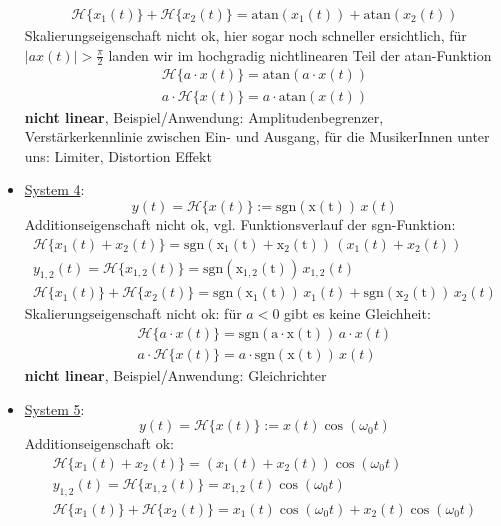 \documentclass[11pt,a4paper,DIV=12]{scrartcl}
\numberwithin{equation}{section}
\numberwithin{figure}{section}
\newcommand{\sysH}[1]{\mathcal{H}{\{#1\}}}
\begin{document}
\begin{Loesung}
\begin{itemize}
\begin{align}
\sysH{x_1(t)} + \sysH{x_2(t)} = \mathrm{atan}(x_1(t)) + \mathrm{atan}(x_2(t))
\end{align}
Skalierungseigenschaft nicht ok, hier sogar noch schneller ersichtlich, für
$|a x(t)|>\frac{\pi}{2}$ landen wir im hochgradig nichtlinearen Teil der atan-Funktion
\begin{align}
\sysH{a \cdot x(t)}= \mathrm{atan}(a \cdot x(t))\\
a \cdot \sysH{x(t)}= a \cdot \mathrm{atan}(x(t))
\end{align}
\textbf{nicht linear}, Beispiel/Anwendung: Amplitudenbegrenzer, Verstärkerkennlinie
zwischen Ein- und Ausgang, für die MusikerInnen unter uns: Limiter, Distortion Effekt
\item  \underline{System 4}:
\begin{equation}
y(t) = \sysH{x(t)}:= \mathrm{sgn(x(t))} \, x(t)
\end{equation}
Additionseigenschaft nicht ok, vgl. Funktionsverlauf der sgn-Funktion:
\begin{align}
\sysH{x_1(t)+x_2(t)}=\mathrm{sgn(x_1(t)+x_2(t))} \, (x_1(t)+x_2(t))\\
y_{1,2}(t) = \sysH{x_{1,2}(t)}= \mathrm{sgn(x_{1,2}(t))} \, x_{1,2}(t)\\
\sysH{x_1(t)} + \sysH{x_2(t)} = \mathrm{sgn(x_{1}(t))} \, x_{1}(t) + \mathrm{sgn(x_{2}(t))} \, x_{2}(t)
\end{align}
Skalierungseigenschaft nicht ok: für $a<0$ gibt es keine Gleichheit:
\begin{align}
\sysH{a \cdot x(t)}= \mathrm{sgn( a \cdot x(t))} \, a \cdot x(t)\\
a \cdot \sysH{x(t)}= a \cdot \mathrm{sgn(x(t))} \, x(t)
\end{align}
\textbf{nicht linear}, Beispiel/Anwendung: Gleichrichter
\item  \underline{System 5}:
\begin{equation}
y(t) = \sysH{x(t)}:= x(t) \cos(\omega_0 t)
\end{equation}
Additionseigenschaft ok:
\begin{align}
\sysH{x_1(t)+x_2(t)}=(x_1(t) + x_2(t)) \cos(\omega_0 t)\\
y_{1,2}(t) = \sysH{x_{1,2}(t)}= x_{1,2}(t) \cos(\omega_0 t)\\
\sysH{x_1(t)} + \sysH{x_2(t)} = x_{1}(t) \cos(\omega_0 t) + x_{2}(t) \cos(\omega_0 t)
\end{align}

\end{itemize}
\end{Loesung}
\end{document}

